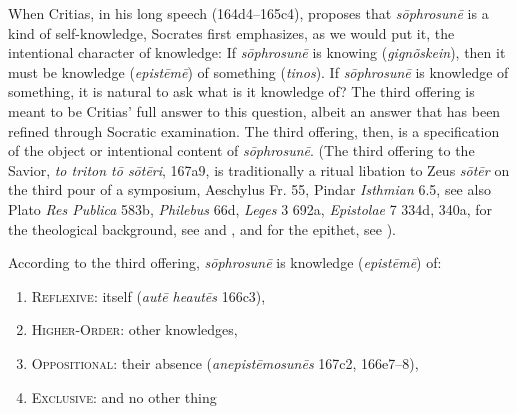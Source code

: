 When Critias, in his long speech (164d4–165c4), proposes that \emph{sōphrosunē} is a kind of self-knowledge, Socrates first emphasizes, as we would put it, the intentional character of knowledge: If \emph{sōphrosunē} is knowing (\emph{gignõskein}), then it must be knowledge (\emph{epistēmē}) of something (\emph{tinos}). If \emph{sōphrosunē} is knowledge of something, it is natural to ask what is it knowledge of? The third offering is meant to be Critias' full answer to this question, albeit an answer that has been refined through Socratic examination. The third offering, then, is a specification of the object or intentional content of \emph{sōphrosunē}. (The third offering to the Savior, \emph{to triton tō sōtēri}, 167a9, is traditionally a ritual libation to Zeus \emph{sōtēr} on the third pour of a symposium, Aeschylus Fr. 55, Pindar \emph{Isthmian} 6.5, see also Plato \emph{Res Publica} 583b, \emph{Philebus} 66d, \emph{Leges} 3 692a, \emph{Epistolae} 7 334d, 340a, for the theological background, see \citealt{Cook:1914la} and  \citealt{Jim:2022ay}, and for the epithet, see \citealt{Rothrauff:1966nh}).


According to the third offering, \emph{sōphrosunē} is knowledge (\emph{epistēmē}) of:
\begin{enumerate}[(1)]
	\item \textsc{Reflexive}: itself (\emph{autē heautēs} 166c3),
	\item \textsc{Higher-Order}: other knowledges,
	\item \textsc{Oppositional}: their absence (\emph{anepistēmosunēs} 167c2, 166e7–8),
	\item \textsc{Exclusive}: and no other thing
\end{enumerate}

